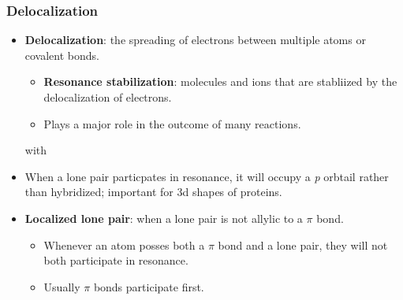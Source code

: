 \documentclass[12pt,a4paper]{article}
\begin{document}
\begin{itemize}
    \subsubsection{Delocalization}
    \begin{itemize}
        \item \textbf{Delocalization}: the spreading of electrons between multiple atoms or covalent bonds.
        \begin{itemize}
            \item \textbf{Resonance stabilization}: molecules and ions that are {\color{o-Sun}stabliized} by the delocalization of electrons.
            \item Plays a major role in the outcome of many reactions.
        \end{itemize}
 with         \item When a lone pair particpates in resonance, it will occupy a \textit{p} orbtail rather than hybridized; important for 3d shapes of proteins.
        \item \textbf{Localized lone pair}: when a lone pair is not allylic to a $\pi$ bond. 
            \begin{itemize}
                \item Whenever an atom posses both a $\pi$ bond and a lone pair, they will not both participate in resonance.
                \item Usually $\pi$ bonds participate first.
            \end{itemize}
    \end{itemize}

\end{itemize}
\end{document}
